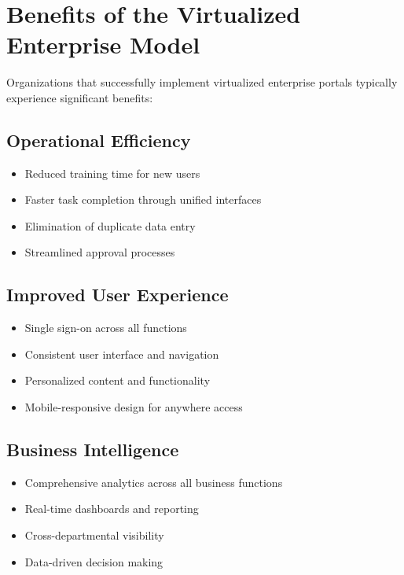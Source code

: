 \section{Benefits of the Virtualized Enterprise Model}
\label{sec:benefits}

Organizations that successfully implement virtualized enterprise portals typically experience significant benefits:

\subsection{Operational Efficiency}

\begin{itemize}
	\item Reduced training time for new users
	\item Faster task completion through unified interfaces
	\item Elimination of duplicate data entry
	\item Streamlined approval processes
\end{itemize}

\subsection{Improved User Experience}

\begin{itemize}
	\item Single sign-on across all functions
	\item Consistent user interface and navigation
	\item Personalized content and functionality
	\item Mobile-responsive design for anywhere access
\end{itemize}

\subsection{Business Intelligence}

\begin{itemize}
	\item Comprehensive analytics across all business functions
	\item Real-time dashboards and reporting
	\item Cross-departmental visibility
	\item Data-driven decision making
\end{itemize}

